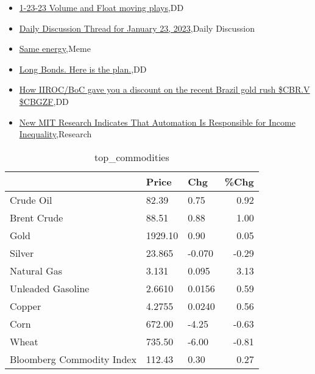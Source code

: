 \documentclass{article}%
\begin{document}
%
\begin{itemize}%
\item%
\href{https://reddit.com/r/wallstreetbets/comments/10jbi13/12323\_volume\_and\_float\_moving\_plays/}{1-23-23 Volume and Float moving plays},DD%
\item%
\href{https://reddit.com/r/wallstreetbets/comments/10j9ugp/daily\_discussion\_thread\_for\_january\_23\_2023/}{Daily Discussion Thread for January 23, 2023},Daily Discussion%
\item%
\href{https://reddit.com/r/wallstreetbets/comments/10j9g03/same\_energy/}{Same energy},Meme%
\item%
\href{https://reddit.com/r/wallstreetbets/comments/10j7y5q/long\_bonds\_here\_is\_the\_plan/}{Long Bonds. Here is the plan.},DD%
\item%
\href{https://reddit.com/r/Baystreetbets/comments/10j9vkq/how\_iirocboc\_gave\_you\_a\_discount\_on\_the\_recent/}{How IIROC/BoC gave you a discount on the recent Brazil gold rush \$CBR.V \$CBGZF},DD%
\item%
\href{https://reddit.com/r/Economics/comments/10j4ryq/new\_mit\_research\_indicates\_that\_automation\_is/}{New MIT Research Indicates That Automation Is Responsible for Income Inequality},Research%
\end{itemize}%


\begin{table}[htbp]%
\caption{top\_commodities}%
\centering%
\begin{adjustbox}{width=1\textwidth}%
\begin{tabular}{lllr}
\toprule
                          &   Price &    Chg &  \%Chg \\
\midrule
               Crude Oil  &   82.39 &   0.75 &  0.92 \\
             Brent Crude  &   88.51 &   0.88 &  1.00 \\
                    Gold  & 1929.10 &   0.90 &  0.05 \\
                  Silver  &  23.865 & -0.070 & -0.29 \\
             Natural Gas  &   3.131 &  0.095 &  3.13 \\
       Unleaded Gasoline  &  2.6610 & 0.0156 &  0.59 \\
                  Copper  &  4.2755 & 0.0240 &  0.56 \\
                    Corn  &  672.00 &  -4.25 & -0.63 \\
                   Wheat  &  735.50 &  -6.00 & -0.81 \\
Bloomberg Commodity Index &  112.43 &   0.30 &  0.27 \\
\bottomrule
\end{tabular}
%
\end{adjustbox}%
\end{table}
\end{document}

